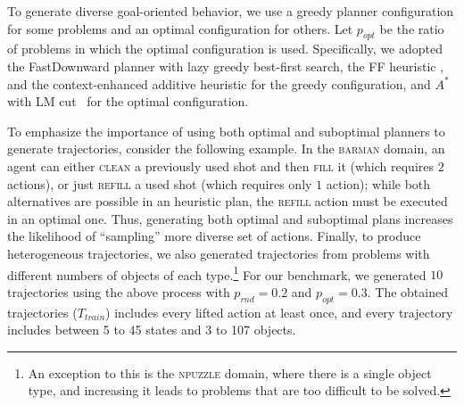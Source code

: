 \documentclass[letterpaper]{article} %
\newcommand{\T}{T}
\newcommand{\Ttrain}{\T_{\textit{train}}}
\newif\ifaddcomments
\newcommand{\roni}[1]{\ifaddcomments{\textcolor{red}{[Roni: #1]}}\fi}
\newcommand{\leo}[1]{\ifaddcomments{\textcolor{pink}{[Leonardo: #1]}}\fi}
\begin{document}
To generate diverse goal-oriented behavior, we use a greedy planner configuration for some problems and an optimal configuration for others. 
Let $p_{opt}$ be the ratio of problems in which the optimal configuration is used. 
Specifically, we adopted the FastDownward planner \citep{helmert2006fast}
with lazy greedy best-first search, the
FF heuristic \citep{hoffmann2001ff}, and the context-enhanced additive heuristic \citep{helmert2008unifying} for the greedy configuration, and $A^*$ with LM cut~\cite{karpas2009cost} for the optimal configuration. 



To emphasize the importance of using both optimal and suboptimal planners to generate trajectories, consider the following example. 
In the \textsc{barman} domain, an agent can either \textsc{clean} a previously used shot and then \textsc{fill} it (which requires $2$ actions), or just \textsc{refill} a used shot (which requires only $1$ action); while both alternatives are possible in an heuristic plan, the \textsc{refill} action must be executed in an optimal one. 
Thus, generating both optimal and suboptimal plans increases the likelihood of ``sampling'' more diverse set of actions. 
Finally, to produce heterogeneous trajectories, we also generated trajectories from problems with different numbers of objects of each type.\footnote{An exception to this is the \textsc{npuzzle} domain, where there is a single object type, and increasing it leads to problems that are too difficult to be solved.} 
%
For our benchmark, we generated $10$ trajectories using the above process with $p_{rnd}=0.2$ and $p_{opt}=0.3$. 
The obtained trajectories ($\Ttrain$) includes every lifted action at least once, and every trajectory includes between 5 to 45 states and 3 to 107 objects. %
\end{document}
